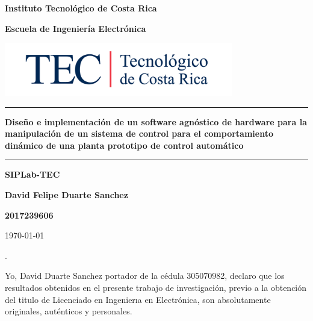 \documentclass[12pt]{article}
\begin{document}
\begin{titlepage}

\centering


\vspace{10cm}

\textbf{\LARGE Instituto Tecnológico de Costa Rica}

\vspace{2cm}

\textbf{\LARGE Escuela de Ingeniería Electrónica}

\vspace{2cm}

\includegraphics[width=10cm]{logotec/image.png}
\vspace{2cm}

\hrule

\vspace{1cm}

\textbf{\LARGE Diseño e implementación de un software agnóstico de hardware para la manipulación de un sistema de control para el  comportamiento dinámico de una planta prototipo de control automático}

\vspace{1cm}

\hrule

\vspace{1cm}

\textbf{\LARGE SIPLab-TEC}

\vspace{1cm}

\textbf{\LARGE David Felipe Duarte Sanchez}

\vspace{1cm}

\textbf{\LARGE 2017239606}

\vspace{1cm}

\today %

\end{titlepage}
.
\par
\vspace{16cm} %

Yo, David Duarte Sanchez portador de la cédula 305070982, declaro que los resultados obtenidos en el presente trabajo de investigación, previo a la obtención del titulo de Licenciado en Ingenierıa en Electrónica, son absolutamente originales, auténticos y personales.
\end{document}
